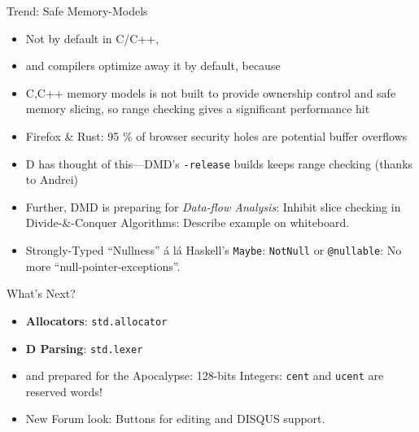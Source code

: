 \documentclass[xcolor=dvipsnames]{beamer}
\begin{document}
\begin{frame}[fragile]{Trend: Safe Memory-Models}
  \begin{itemize}[<+->]
  \item Not by default in C/C++,
  \item and compilers optimize away it by default, because
  \item C,C++ memory models is not built to provide ownership control and safe
    memory slicing, so range checking gives a significant performance hit
  \item Firefox \& Rust: 95 \% of browser security holes are potential buffer
    overflows
  \item D has thought of this---DMD's \texttt{-release} builds keeps range
    checking (thanks to Andrei)
  \item Further, DMD is preparing for \emph{Data-flow Analysis}: Inhibit slice
    checking in Divide-\&-Conquer Algorithms: Describe example on whiteboard.
  \item Strongly-Typed ``Nullness'' á lá Haskell's \texttt{Maybe}: \texttt{NotNull} or
    \texttt{@nullable}: No more ``null-pointer-exceptions''.
  \end{itemize}
\end{frame}

\begin{frame}[fragile]{What's Next?}
  \begin{itemize}[<+->]
  \item \textbf{Allocators}: \texttt{std.allocator}
  \item \textbf{D Parsing}: \texttt{std.lexer}
  \item and prepared for the Apocalypse: 128-bits Integers: \texttt{cent} and
    \texttt{ucent} are reserved words!
  \item New Forum look: Buttons for editing and DISQUS support.
  \end{itemize}
\end{frame}
\end{document}
